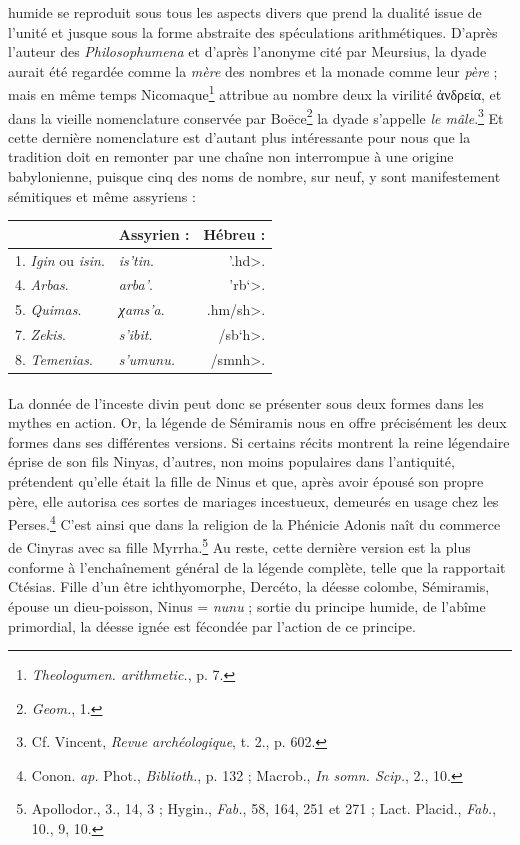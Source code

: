 \documentclass[a4paper, 11pt, oneside]{article}
\begin{document}
humide se reproduit sous tous les aspects divers que prend la dualité issue de l'unité et jusque sous la forme abstraite des spéculations arithmétiques. D'après l'auteur des \emph{Philosophumena} et d'après l'anonyme cité par Meursius, la dyade aurait été regardée comme la \emph{mère} des nombres et la monade comme leur \emph{père} ; mais en même temps Nicomaque\footnote{\emph{Theologumen. arithmetic.}, p. 7.} attribue au nombre deux la virilité ἀνδρεία, et dans la vieille nomenclature conservée par Boëce\footnote{\emph{Geom.}, 1.} la dyade s'appelle \emph{le mâle}.\footnote{Cf. Vincent, \emph{Revue archéologique}, t. 2., p. 602.} Et cette dernière nomenclature est d'autant plus intéressante pour nous que la tradition doit en remonter par une chaîne non interrompue à une origine babylonienne, puisque cinq des noms de nombre, sur neuf, y sont manifestement sémitiques et même assyriens :
\begin{table}[H]
    \centering
    \small
    \begin{tabular}{l l r}
    \hline
        ~ & Assyrien : & Hébreu :   \\ \hline
        1. \emph{Igin} ou \emph{isin}. & \emph{is'tin}. & \<'.hd>. \\
        4. \emph{Arbas}. & \emph{arba'}. & \<'rb`>. \\ 
        5. \emph{Quimas}. & \emph{χams'a}. & \<.hm/sh>. \\ 
        7. \emph{Zekis}. & \emph{s'ibit}. & \</sb`h>. \\ 
        8. \emph{Temenias}. & \emph{s'umunu.} & \</smnh>. \\ 
    \end{tabular}
\end{table}
\paragraph{}
La donnée de l'inceste divin peut donc se présenter sous deux formes dans les mythes en action. Or, la légende de Sémiramis nous en offre précisément les deux formes dans ses différentes versions. Si certains récits montrent la reine légendaire éprise de son fils Ninyas, d'autres, non moins populaires dans l'antiquité, prétendent qu'elle était la fille de Ninus et que, après avoir épousé son propre père, elle autorisa ces sortes de mariages incestueux, demeurés en usage chez les Perses.\footnote{Conon. \emph{ap.} Phot., \emph{Biblioth.}, p. 132 ; Macrob., \emph{In somn. Scip.}, 2., 10.} C'est ainsi que dans la religion de la Phénicie Adonis naît du commerce de Cinyras avec sa fille Myrrha.\footnote{Apollodor., 3., 14, 3 ; Hygin., \emph{Fab.}, 58, 164, 251 et 271 ; Lact. Placid., \emph{Fab.}, 10., 9, 10.} Au reste, cette dernière version est la plus conforme à l'enchaînement général de la légende complète, telle que la rapportait Ctésias. Fille d'un être ichthyomorphe, Dercéto, la déesse colombe, Sémiramis, épouse un dieu-poisson, Ninus = \emph{nunu} ; sortie du principe humide, de l'abîme primordial, la déesse ignée est fécondée par l'action de ce principe.
\end{document}
